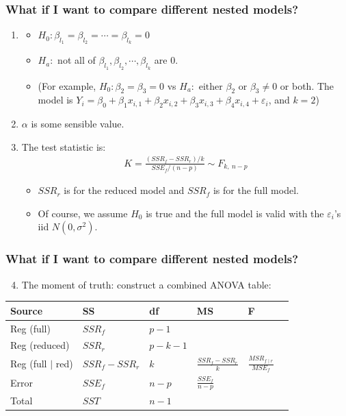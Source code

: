 \documentclass[handout]{beamer}\usepackage[]{graphicx}\usepackage[]{color}
\providecommand{\e}{\varepsilon}
\numberwithin{equation}{section}
\begin{document}
\begin{frame}
\frametitle{What if I want to compare different nested models?}
\begin{enumerate}[1. ]
\item 
\begin{itemize}
\item $H_0: \beta_{l_1}= \beta_{l_2}  = \cdots = \beta_{l_k} = 0$
\pause \item $H_a:$ not all of $\beta_{l_1}, \beta_{l_2}, \cdots, \beta_{l_k}$ are 0.
\pause \item 
(For example, $H_0: \beta_2 = \beta_3 = 0$ vs $H_a: \text{ either } \beta_2 \text{ or } \beta_3 \ne 0$ or both. The model is $Y_i = \beta_0 + \beta_1 x_{i,1} + \beta_2 x_{i,2} +  \beta_3 x_{i,3} +  \beta_4 x_{i,4} + \e_i$, and $k = 2$)

\end{itemize}
\pause \item $\alpha$ is some sensible value.
\pause \item The test statistic is:
\pause \begin{align*}
K = \frac{(SSR_f - SSR_r)/k}{SSE_f/(n-p)} \sim F_{k, \ n-p}
\end{align*}
\begin{itemize}
\pause \item $SSR_r$ is for the reduced model and $SSR_f$ is for the full model.
\pause \item Of course, we assume $H_0$ is true and the full model is valid with the $\e_i$'s iid $N(0, \sigma^2)$.
\end{itemize}
\end{enumerate}
\end{frame}


\begin{frame}
\frametitle{What if I want to compare different nested models?} \scriptsize
\begin{enumerate} 
\setcounter{enumi}{3}
\item The moment of truth: construct a combined ANOVA table:
\end{enumerate}
\begin{center}
\begin{tabular}{llllll}
Source & SS & df & MS & F & \\ \hline
Reg (full) & $SSR_f$ & $p-1$ &  & &  \\ 
Reg (reduced) & $SSR_r$ & $p-k-1$&  & &  \\ 
Reg (full $\mid$ red) & $SSR_f - SSR_r$ & $k$ & $\frac{SSR_f - SSR_r}{k}$ & $\frac{MSR_{f \mid r}}{MSE_f}$ &  \\ 
Error & $SSE_f$ & $n-p$ & $\frac{SSE_f}{n-p}$& & \\ \hline
Total & $SST$ & $n-1$ & & & 
\end{tabular}
\end{center}
\end{frame}
\end{document}
